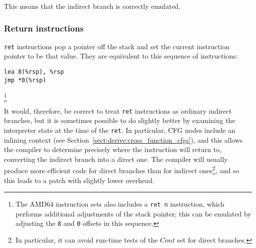 This means that the indirect branch is correctly
emulated.




\subsubsection{Return instructions}

\texttt{ret} instructions pop a pointer off the stack and set the
current instruction pointer to be that value.  They are equivalent to
this sequence of instructions:

\begin{verbatim}
lea 8(%rsp), %rsp
jmp *0(%rsp)
\end{verbatim}\footnote{The AMD64 instruction sets also includes a \texttt{ret n} instruction, which performs additional adjustments of the stack pointer; this can be emulated by adjusting the \texttt{8} and \texttt{0} offsets in this sequence.}

It would, therefore, be correct to treat \texttt{ret} instructions as
ordinary indirect branches, but it is sometimes possible to do
slightly better by examining the interpreter state at the time of the
\texttt{ret}.  In particular, CFG nodes include an inlining context
(see Section~\ref{sect:derive:cross_function_cfgs}), and this allows
the compiler to determine precisely where the instruction will return
to, converting the indirect branch into a direct one.  The compiler
will usually produce more efficient code for direct branches than for
indirect ones\footnote{In particular, it can avoid run-time tests of
  the $\mathit{Cont}$ set for direct branches.}, and so this leads to
a patch with slightly lower overhead.

